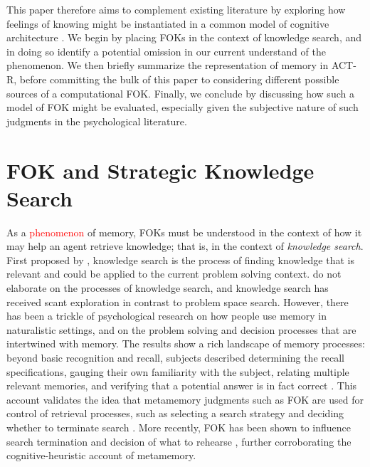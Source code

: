 \documentclass[10pt,letterpaper]{article}
\newcommand{\fixme}[2][]{#2}
\renewcommand{\fixme}[2][]{\textcolor{red}{#2}}
\newcommand{\textcite}[1]{\citeauthor{#1} \citeyear{#1}}
\begin{document}
This paper therefore aims to complement existing literature by exploring how feelings of knowing might be instantiated in a common model of cognitive architecture \cite{Laird2017AStandardModel}.
We begin by placing FOKs in the context of knowledge search, and in doing so identify a potential omission in our current understand of the phenomenon.
We then briefly summarize the representation of memory in ACT-R, before committing the bulk of this paper to considering different possible sources of a computational FOK.
Finally, we conclude by discussing how such a model of FOK might be evaluated, especially given the subjective nature of such judgments in the psychological literature.

\section{FOK and Strategic Knowledge Search}

As a \fixme{phenomenon} of memory, FOKs must be understood in the context of how it may help an agent retrieve knowledge; that is, in the context of \textit{knowledge search}.
First proposed by \textcite{Newell1972HumanProblemSolving}, knowledge search is the process of finding knowledge that is relevant and could be applied to the current problem solving context.
\citeauthor{Newell1972HumanProblemSolving} do not elaborate on the processes of knowledge search, and knowledge search has received scant exploration in contrast to problem space search.
However, there has been a trickle of psychological research on how people use memory in naturalistic settings, and on the problem solving and decision processes that are intertwined with memory.
The results show a rich landscape of memory processes: beyond basic recognition and recall, subjects described determining the recall specifications, gauging their own familiarity with the subject, relating multiple relevant memories, and verifying that a potential answer is in fact correct \cite{Burgess1996ConfabulationAndThe}.
This account validates the idea that metamemory judgments such as FOK are used for control of retrieval processes, such as selecting a search strategy and deciding whether to terminate search \cite{Nelson1990MetamemoryATheoretical}.
More recently, FOK has been shown to influence search termination and decision of what to rehearse \cite{Singer2008FeelingOfKnowing,Hanczakowski2014FeelingOfKnowing}, further corroborating the cognitive-heuristic account of metamemory.
\end{document}
